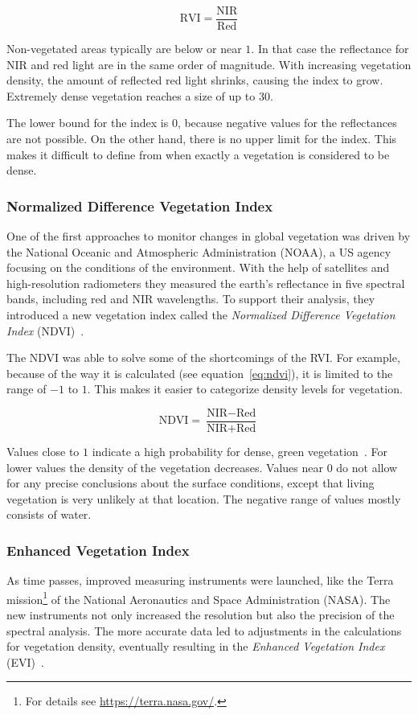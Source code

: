 \begin{equation}
    \text{RVI} = \frac{\text{NIR}}{\text{Red}}
    \label{eq:rvi}
\end{equation}

Non-vegetated areas typically are below or near $1$. In that case the reflectance for NIR and red light are in the same order of magnitude. With increasing vegetation density, the amount of reflected red light shrinks, causing the index to grow. Extremely dense vegetation reaches a size of up to $30$.

The lower bound for the index is $0$, because negative values for the reflectances are not possible. On the other hand, there is no upper limit for the index. This makes it difficult to define from when exactly a vegetation is considered to be dense.

\subsubsection{Normalized Difference Vegetation Index}
One of the first approaches to monitor changes in global vegetation was driven by the National Oceanic and Atmospheric Administration (NOAA), a US agency focusing on the conditions of the environment. With the help of satellites and high-resolution radiometers they measured the earth's reflectance in five spectral bands, including red and NIR wavelengths. To support their analysis, they introduced a new vegetation index called the \emph{Normalized Difference Vegetation Index} (NDVI)~\cite{measuring_vegetation00}.

The NDVI was able to solve some of the shortcomings of the RVI. For example, because of the way it is calculated (see equation~\ref{eq:ndvi}), it is limited to the range of $-1$ to $1$. This makes it easier to categorize density levels for vegetation.

\begin{equation}
    \text{NDVI} = \frac{\text{NIR}-\text{Red}}{\text{NIR}+\text{Red}}
    \label{eq:ndvi}
\end{equation}

Values close to $1$ indicate a high probability for dense, green vegetation~\cite{gisg_ndvi20}. For lower values the density of the vegetation decreases. Values near $0$ do not allow for any precise conclusions about the surface conditions, except that living vegetation is very unlikely at that location. The negative range of values mostly consists of water.

\subsubsection{Enhanced Vegetation Index}
As time passes, improved measuring instruments were launched, like the Terra mission\footnote{For details see \url{https://terra.nasa.gov/}.} of the National Aeronautics and Space Administration (NASA). The new instruments not only increased the resolution but also the precision of the spectral analysis. The more accurate data led to adjustments in the calculations for vegetation density, eventually resulting in the \emph{Enhanced Vegetation Index} (EVI)~\cite{modis2002}.

